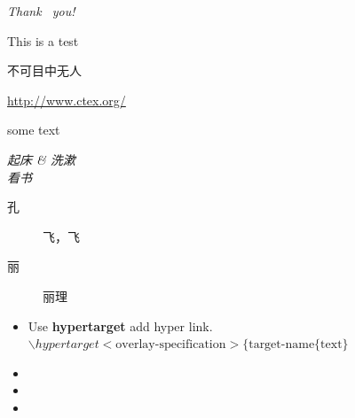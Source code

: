 
{\huge \emph{\textcolor{blue!80}{Thank  ~you!}}}\\

\hfill \hyperlink{target4}{}

\colorbox{yellow!85}{This is a test}

\item[\handr] 不可目中无人

\url{http://www.ctex.org/}

\begin{block}{}
some text
\end{block}

\tableofcontents[currentsection,currentsubsection,subsectionstyle=show/show/hide]
\emph{ 起床 \& 洗漱}\\
\emph{ 看书}

\date{\today}




\tableofcontents[currentsection,currentsubsection,subsectionstyle=hide]

\begin{description}
    \item [孔]飞，飞
    \item [丽]丽理
\end{description}

  \begin{itemize}
  \item Use \textbf{hypertarget} add hyper link.\\
    $\backslash hypertarget<\mbox{overlay-specification}>\{\mbox{target-name}\{\mbox{text}\}$
    \hyperlink{jumptosecond}{}
    \hypertarget<2>{jumptosecond}{}
  \item {}
  \item {}
  \item {}
  \end{itemize}

